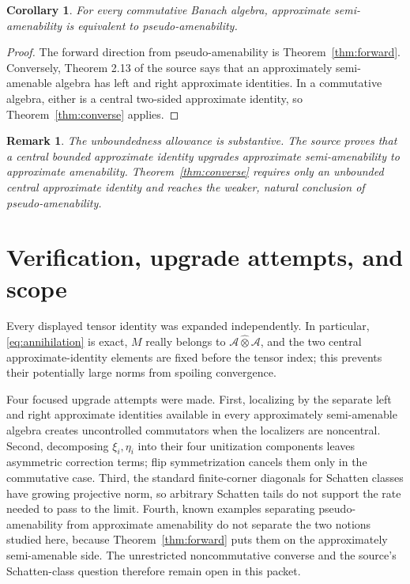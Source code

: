 \documentclass[11pt]{article}
\newtheorem{corollary}[theorem]{Corollary}
\newtheorem{remark}[theorem]{Remark}
\newcommand{\A}{\mathcal A}
\newcommand{\tp}{\widehat\otimes}
\begin{document}
\begin{corollary}\label{cor:commutative}
For every commutative Banach algebra, approximate semi-amenability is
equivalent to pseudo-amenability.
\end{corollary}
\begin{proof}
The forward direction from pseudo-amenability is
Theorem~\ref{thm:forward}.  Conversely, Theorem 2.13 of the source says that
an approximately semi-amenable algebra has left and right approximate
identities.  In a commutative algebra, either is a central two-sided
approximate identity, so Theorem~\ref{thm:converse} applies.
\end{proof}

\begin{remark}
The unboundedness allowance is substantive.  The source proves that a
central \emph{bounded} approximate identity upgrades approximate
semi-amenability to approximate amenability.  Theorem~\ref{thm:converse}
requires only an unbounded central approximate identity and reaches the
weaker, natural conclusion of pseudo-amenability.
\end{remark}

\begingroup
\small
\section{Verification, upgrade attempts, and scope}
Every displayed tensor identity was expanded independently.  In particular,
\eqref{eq:annihilation} is exact, $M$ really belongs to $\A\tp\A$, and the
two central approximate-identity elements are fixed before the tensor index;
this prevents their potentially large norms from spoiling convergence.

Four focused upgrade attempts were made.  First, localizing by the separate
left and right approximate identities available in every approximately
semi-amenable algebra creates uncontrolled commutators when the localizers
are noncentral.  Second, decomposing $\xi_i,\eta_i$ into their four unitization
components leaves asymmetric correction terms; flip symmetrization cancels
them only in the commutative case.  Third, the standard finite-corner
diagonals for Schatten classes have growing projective norm, so arbitrary
Schatten tails do not support the rate needed to pass to the limit.  Fourth,
known examples separating pseudo-amenability from approximate amenability do
not separate the two notions studied here, because
Theorem~\ref{thm:forward} puts them on the approximately semi-amenable side.
The unrestricted noncommutative converse and the source's Schatten-class
question therefore remain open in this packet.
\end{document}
